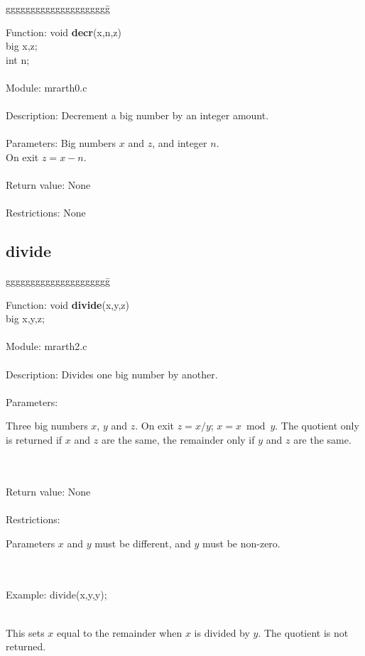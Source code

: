 \begin{tabbing}
ggggggggggggggggggggg\= \kill

      Function:      \>void {\bf decr}(x,n,z) \\
                     \>big x,z;   \\
                     \>int n;     \\
      \ \\
      Module:        \>mrarth0.c   \\
      \ \\
      Description:   \>Decrement a big number by an integer amount. \\
      \ \\
      Parameters:    \>Big numbers $x$ and $z$, and integer $n$.\\
                     \>On exit $z=x-n$. \\
      \ \\
      Return value:  \>None \\
      \ \\
      Restrictions:  \>None  \\
\end{tabbing}

\subsection{divide}

\begin{tabbing}
ggggggggggggggggggggg\= \kill

      Function:      \>void {\bf divide}(x,y,z)  \\
                     \>big x,y,z; \\
      \ \\
      Module:        \>mrarth2.c \\
      \ \\
      Description:   \>Divides one big number by another.   \\
      \ \\
      Parameters:    \>
                     \parbox[t]{3in}
                     {Three big numbers $x$, $y$ and $z$. On exit $z=x/y$; $x=x \bmod y$.
                     The quotient only is returned if $x$ and $z$ are the same, the
                     remainder only if $y$ and $z$ are the same.} \\
      \ \\
      Return value:  \>None     \\
      \ \\
      Restrictions:  \>
                     \parbox[t]{3 in}
                     {Parameters $x$ and $y$ must be different, and $y$ must 
                     be non-zero.} \\
      \ \\
      Example:       \>divide(x,y,y); \\
      \ \\
                     \>
                     \parbox[t]{3 in}
                     {This sets $x$ equal to the remainder when $x$ is
                     divided by $y$. The quotient is not returned.} 
\end{tabbing}
\pagebreak
